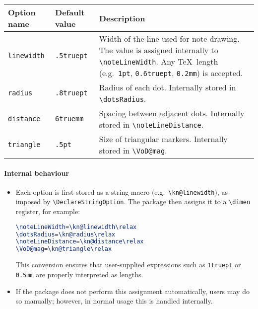 \documentclass[a4paper,12pt]{article}
\begin{document}
\bigskip
\begin{center}
  \begin{tabular}{l l p{.6\linewidth}}
    \toprule
    Option name & Default value & Description \\
    \midrule
    \texttt{linewidth} & \texttt{.5truept}
      & Width of the line used for note drawing.  
        The value is assigned internally to \verb|\noteLineWidth|.  
        Any \TeX\ length (e.g.\ \texttt{1pt}, \texttt{0.6truept}, \texttt{0.2mm}) is accepted. \\
    \texttt{radius} & \texttt{.8truept}
      & Radius of each dot.  
        Internally stored in \verb|\dotsRadius|. \\
    \texttt{distance} & \texttt{6truemm}
      & Spacing between adjacent dots.  
        Internally stored in \verb|\noteLineDistance|. \\
    \texttt{triangle} & \texttt{.5pt}
      & Size of triangular markers.  
        Internally stored in \verb|\VoD@mag|. \\
    \bottomrule
  \end{tabular}
\end{center}
\bigskip

\paragraph{Internal behaviour}
\begin{itemize}
  \item Each option is first stored as a string macro (e.g.\ \verb|\kn@linewidth|), as imposed by \verb|\DeclareStringOption|.
        The package then assigns it to a \verb|\dimen| register, for example:
\begin{lstlisting}[language=TeX]
\noteLineWidth=\kn@linewidth\relax
\dotsRadius=\kn@radius\relax
\noteLineDistance=\kn@distance\relax
\VoD@mag=\kn@triangle\relax
\end{lstlisting}
        This conversion ensures that user-supplied expressions such as
        \texttt{1truept} or \texttt{0.5mm} are properly interpreted as lengths.
  \item If the package does not perform this assignment automatically,
        users may do so manually; however, in normal usage this is handled internally.
\end{itemize}
\end{document}
